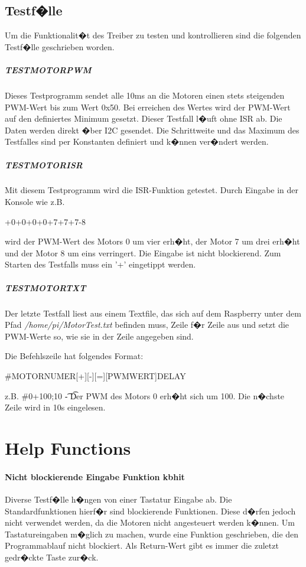 \subsection{Testf�lle}

Um die Funktionalit�t des Treiber zu testen und kontrollieren sind die folgenden Testf�lle geschrieben worden. 

\subparagraph{TESTMOTORPWM}

Dieses Testprogramm sendet alle 10ms an die Motoren einen stets steigenden PWM-Wert bis zum Wert 0x50. Bei erreichen des Wertes wird der PWM-Wert auf den definiertes Minimum gesetzt. Dieser Testfall l�uft ohne ISR ab. Die Daten werden direkt �ber I2C gesendet. Die Schrittweite und das Maximum des Testfalles sind per Konstanten definiert und k�nnen ver�ndert werden. 

\subparagraph{TESTMOTORISR}

Mit diesem Testprogramm wird die ISR-Funktion getestet. Durch Eingabe in der Konsole wie z.B.

+0+0+0+0+7+7+7-8

wird der  PWM-Wert des Motors 0 um vier erh�ht, der Motor 7 um drei erh�ht und der Motor 8 um eins verringert. Die Eingabe ist nicht blockierend. Zum Starten des Testfalls muss ein '+' eingetippt werden.

\subparagraph{TESTMOTORTXT}

Der letzte Testfall liest aus einem Textfile, das sich auf dem Raspberry unter dem Pfad \emph{/home/pi/MotorTest.txt} befinden muss, Zeile f�r Zeile aus und setzt die PWM-Werte so, wie sie in der Zeile angegeben sind.

Die Befehlszeile hat folgendes Format:
\newline
\begin{center}
\#MOTORNUMER[+][-][=][PWMWERT]\;DELAY
\end{center}
z.B.
\#0+100;10 \t - \t Der PWM des Motors 0 erh�ht sich um 100. Die n�chste Zeile wird in 10s eingelesen.
\newpage
\section{Help Functions}

\paragraph{Nicht blockierende Eingabe Funktion kbhit}
Diverse Testf�lle h�ngen von einer Tastatur Eingabe ab. Die Standardfunktionen hierf�r sind blockierende Funktionen. Diese d�rfen jedoch nicht verwendet werden, da die Motoren nicht angesteuert werden k�nnen.
Um Tastatureingaben m�glich zu machen, wurde eine Funktion geschrieben, die den Programmablauf nicht blockiert. Als Return-Wert gibt es immer die zuletzt gedr�ckte Taste zur�ck.

